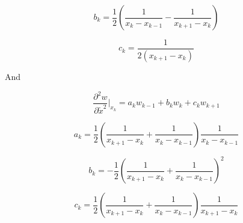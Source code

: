 \begin{equation}
b_k=\frac{1}{2}\left(\frac{1}{x_k-x_{k-1}}-\frac{1}{x_{k+1}-x_k}\right)
\end{equation}

\begin{equation}
c_k=\frac{1}{2(x_{k+1}-x_k)}
\end{equation}

And

\begin{equation}
\frac{\partial^2 w}{\partial \tilde x^2}|_{x_k}=a_k w_{k-1}+b_k w_{k}+c_k w_{k+1}
\end{equation}

\begin{equation}
a_k=\frac{1}{2}\left(\frac{1}{x_{k+1}-x_k}+\frac{1}{x_k-x_{k-1}}\right)\frac{1}{x_k-x_{k-1}}
\end{equation}

\begin{equation}
b_k=-\frac{1}{2}\left(\frac{1}{x_{k+1}-x_k}+\frac{1}{x_k-x_{k-1}}\right)^2
\end{equation}

\begin{equation}
c_k=\frac{1}{2}\left(\frac{1}{x_{k+1}-x_k}+\frac{1}{x_k-x_{k-1}}\right)\frac{1}{x_{k+1}-x_k}
\end{equation}

